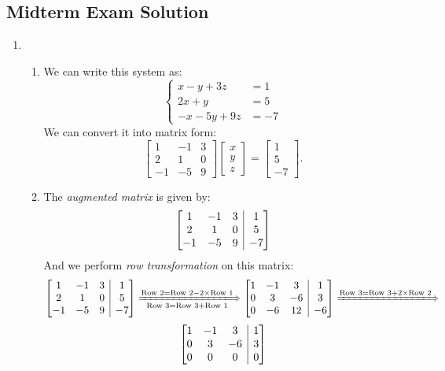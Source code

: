 \subsection{Midterm Exam Solution}
\begin{enumerate}
\item
\begin{enumerate}
\item
We can write this system as:
\[
\left\{\begin{aligned}
x-y+3z&=1\\
2x+y&=5\\
-x-5y+9z&=-7
\end{aligned}\right.
\]
We can convert it into matrix form:
\[
\begin{bmatrix}
1&-1&3\\
2&1&0\\
-1&-5&9
\end{bmatrix}\begin{bmatrix}
x\\y\\z
\end{bmatrix}=\begin{bmatrix}
1\\5\\-7
\end{bmatrix}.
\]
\item
The \textit{augmented matrix} is given by:
\[
\left[\begin{array}{@{}ccc|c@{}}
1&-1&3&1\\
2&1&0&5\\
-1&-5&9&-7
\end{array}\right]
\]
And we perform \textit{row transformation} on this matrix:
\[
\left[\begin{array}{@{}ccc|c@{}}
1&-1&3&1\\
2&1&0&5\\
-1&-5&9&-7
\end{array}\right]
\xLongrightarrow[\text{Row 3}=\text{Row 3}+\text{Row 1}]{\text{Row 2}=\text{Row 2}-2\x\text{Row 1}}
\left[\begin{array}{@{}ccc|c@{}}
1&-1&3&1\\
0&3&-6&3\\
0&-6&12&-6
\end{array}\right]
\xLongrightarrow{\text{Row 3}=\text{Row 3}+2\x\text{Row 2}}
\]
\[
\left[\begin{array}{@{}ccc|c@{}}
1&-1&3&1\\
0&3&-6&3\\
0&0&0&0
\end{array}\right]
\]
\end{enumerate}
\end{enumerate}
